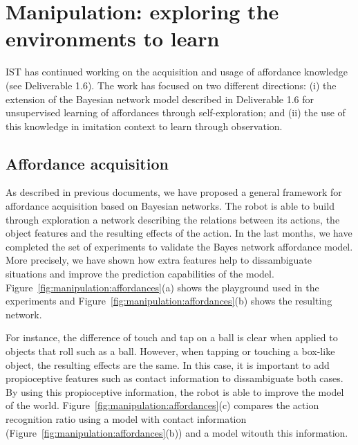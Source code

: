 \section{Manipulation: exploring the environments to learn}
IST has continued working on the acquisition and usage of affordance
knowledge (see Deliverable 1.6). The work has focused on two different
directions: (i) the extension of the Bayesian network model described
in Deliverable 1.6 for unsupervised learning of  affordances through
self-exploration; and (ii) the use of this knowledge in imitation
context to learn through observation.

\subsection{Affordance acquisition}
As described in previous documents, we have proposed a general
framework for affordance acquisition based on Bayesian networks. The
robot is able to build through exploration a network describing the
relations between its actions, the object features and the resulting
effects of the action. In the last months, we have completed the set
of experiments to validate the Bayes network affordance model. More
precisely, we have shown how extra features help to dissambiguate
situations and improve the prediction capabilities of the
model. Figure~\ref{fig:manipulation:affordances}(a) shows the playground used in the experiments and
Figure~\ref{fig:manipulation:affordances}(b) shows the resulting network.

For instance, the difference of touch and tap on a ball is clear when
applied to objects that roll such as a ball. However, when tapping or
touching a box-like object, the resulting effects are the same. In
this case, it is important to add propioceptive features such as
contact information to dissambiguate both cases. By using this
propioceptive information, the robot is able to improve the model of
the world. Figure~\ref{fig:manipulation:affordances}(c) compares the action recognition ratio using a
model with contact information (Figure~\ref{fig:manipulation:affordances}(b)) and a model witouth this
information.

